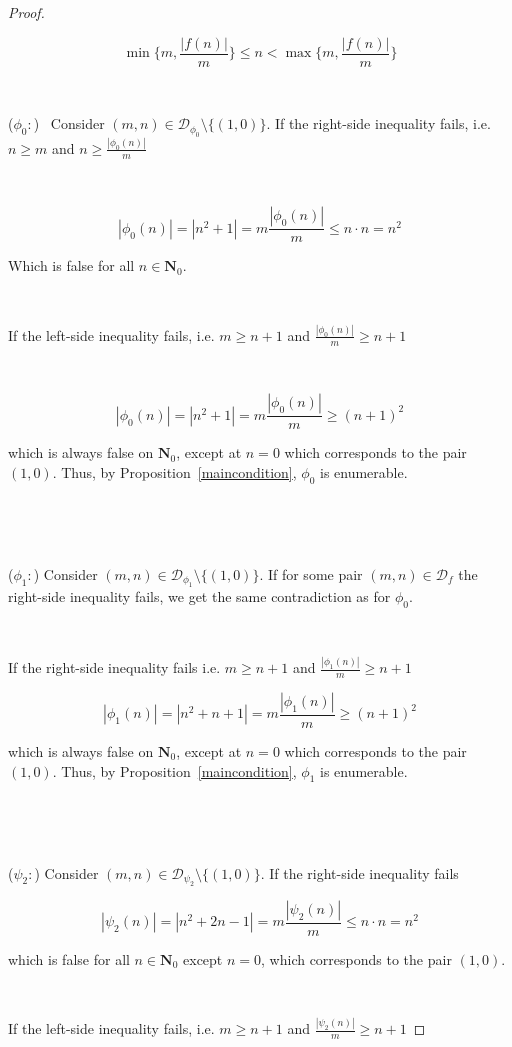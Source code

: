 \documentclass{article}
\begin{document}
\begin{proof}
\

$$\min \{m, \frac{|f(n)|}{m} \} \leq n < \max \{m, \frac{|f(n)|}{m} \}$$

\



($\phi_0:$) \ Consider $(m, n) \in \mathcal{D}_{\phi_0} \setminus \{(1,0)\}$. If the right-side inequality fails, i.e. $n \geq m$ and $n \geq \frac{|\phi_0(n)|}{m}$

\

$$|\phi_0(n)| = |n^2 + 1| = m \frac{|\phi_0(n)|}{m} \leq n \cdot n = n^2$$

Which is false for all $n \in \mathbf{N}_0$.

\

If the left-side inequality fails, i.e. $m \geq n+1$ and $\frac{|\phi_0(n)|}{m} \geq n+1$

\

$$|\phi_0(n)| = |n^2 + 1| = m \frac{|\phi_0(n)|}{m} \geq (n+1)^2$$

which is always false on $\mathbf{N}_0$, except at $n = 0$ which corresponds to the pair $(1,0)$. Thus, by Proposition~\ref{maincondition}, $\phi_0$ is enumerable.

\

\

($\phi_1:$) Consider $(m, n) \in \mathcal{D}_{\phi_1} \setminus \{(1,0)\}$.
If for some pair $(m, n) \in \mathcal{D}_f$ the right-side inequality fails, we get the same contradiction as for $\phi_0$.

\

If the right-side inequality fails i.e. $m \geq n+1$ and $\frac{|\phi_1(n)|}{m} \geq n+1$

$$|\phi_1(n)| = |n^2 + n + 1| = m\frac{|\phi_1(n)|}{m} \geq (n+1)^2$$

which is always false on $\mathbf{N}_0$, except at $n = 0$ which corresponds to the pair $(1,0)$. Thus, by Proposition~\ref{maincondition}, $\phi_1$ is enumerable.

\

\

($\psi_2:$) Consider $(m, n) \in \mathcal{D}_{\psi_2} \setminus \{(1,0)\}$. If the right-side inequality fails


$$|\psi_2(n)| = |n^2 + 2n - 1| = m \frac{|\psi_2(n)|}{m} \leq n \cdot n = n^2$$

which is false for all $n \in \mathbf{N}_0$ except $n=0$, which corresponds to the pair $(1,0)$.

\

If the left-side inequality fails, i.e. $m \geq n+1$ and $\frac{|\psi_2(n)|}{m} \geq n+1$


\end{proof}
\end{document}
